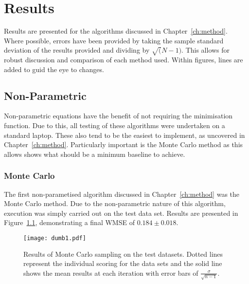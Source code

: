 \chapter{Results}










\graphicspath{{Chapter4/Figs/Vector/}{Chapter4/Figs/}}
Results are presented for the algorithms discussed in Chapter~\ref{ch:method}. Where possible, errors have been provided by taking the sample standard deviation of the results provided and dividing by $\sqrt(N-1)$. This allows for robust discussion and comparison of each method used. Within figures, lines are added to guid the eye to changes.

\section{Non-Parametric}
Non-parametric equations have the benefit of not requiring the minimisation function. Due to this, all testing of these algorithms were undertaken on a standard laptop. These also tend to be the easiest to implement, as uncovered in Chapter~\ref{ch:method}. Particularly important is the Monte Carlo method as this allows shows what should be a minimum baseline to achieve.

\subsection{Monte Carlo}
The first non-parametised algorithm discussed in Chapter~\ref{ch:method} was the Monte Carlo method. Due to the non-parametric nature of this algorithm, execution was simply carried out on the test data set. Results are presented in Figure~\ref{fig:MCTestSet}, demonstrating a final WMSE of ${0.184\pm{}0.018}$.

\begin{figure}[H]
    \begin{center}
        \texttt{[image: dumb1.pdf]}
        \caption[Monte Carlo]{Results of Monte Carlo sampling on the test datasets. Dotted lines represent the individual scoring for the data sets and the solid line shows the mean results at each iteration with error bars of $\frac{\sigma{}}{\sqrt{n-1}}$.}
        \label{fig:MCTestSet}
    \end{center}
\end{figure}

